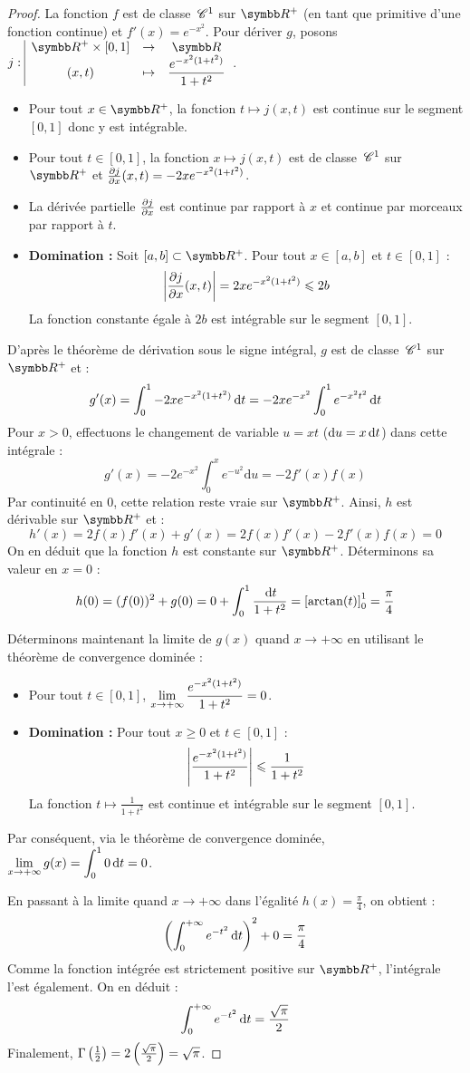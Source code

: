 \begin{proof}
    La fonction $f$ est de classe $\,\mathscr C^{1}$ sur $\R^+$ (en tant que primitive d'une fonction continue) et $f'(x) = e^{-x^2}$.
    Pour dériver $g$, posons $\fonction{j}{\R^+ \times [0,1]}{\R}{(x,t)}{\frac{e^{-x^2(1+t^2)}}{1+t^2}}$.
    \begin{itemize}
        \item Pour tout $x \in \R^+$, la fonction $t \mapsto j(x,t)$ est continue sur le segment $[0,1]$ donc y est intégrable.
        \item Pour tout $t \in [0,1]$, la fonction $x \mapsto j(x,t)$ est de classe $\,\mathscr C^{1}$ sur $\R^+$ et $\frac{\partial j}{\partial x}(x,t) = -2x e^{-x^2(1+t^2)}$.
        \item La dérivée partielle $\frac{\partial j}{\partial x}$ est continue par rapport à $x$ et continue par morceaux par rapport à $t$.
        \item \textbf{Domination :} Soit $[a,b] \subset \R^+$. Pour tout $x \in [a,b]$ et $t \in [0,1]$ :
        \[ \left|\frac{\partial j}{\partial x}(x,t)\right| = 2x e^{-x^2(1+t^2)} \leqslant 2b \]
        La fonction constante égale à $2b$ est intégrable sur le segment $[0,1]$.
    \end{itemize}
    D'après le théorème de dérivation sous le signe intégral, $g$ est de classe $\,\mathscr C^{1}$ sur $\R^+$ et :
    \[ g'(x) = \int_0^1 -2x e^{-x^2(1+t^2)} \,\mathrm{d}t = -2x e^{-x^2} \int_0^1 e^{-x^2 t^2} \,\mathrm{d}t \]
    Pour $x > 0$, effectuons le changement de variable $u = xt$ ($\mathrm{d}u = x\,\mathrm{d}t$) dans cette intégrale :
    \[ g'(x) = -2 e^{-x^2} \int_0^x e^{-u^2} \mathrm{d}u = -2 f'(x) f(x) \]
    Par continuité en $0$, cette relation reste vraie sur $\R^+$.
    Ainsi, $h$ est dérivable sur $\R^+$ et :
    \[ h'(x) = 2 f(x) f'(x) + g'(x) = 2 f(x) f'(x) - 2 f'(x) f(x) = 0 \]
    On en déduit que la fonction $h$ est constante sur $\R^+$. Déterminons sa valeur en $x=0$ :
    \[ h(0) = (f(0))^2 + g(0) = 0 + \int_0^1 \frac{\,\mathrm{d}t}{1+t^2} = \left[\arctan(t)\right]_0^1 = \frac{\pi}{4} \]

    Déterminons maintenant la limite de $g(x)$ quand $x \to +\infty$ en utilisant le théorème de convergence dominée :
    \begin{itemize}
        \item Pour tout $t \in [0,1]$, $\displaystyle\lim_{x \to +\infty} \frac{e^{-x^2(1+t^2)}}{1+t^2} = 0$.
        \item \textbf{Domination :} Pour tout $x \geqslant 0$ et $t \in [0,1]$ :
        \[ \left|\frac{e^{-x^2(1+t^2)}}{1+t^2}\right| \leqslant \frac{1}{1+t^2} \]
        La fonction $t \mapsto \frac{1}{1+t^2}$ est continue et intégrable sur le segment $[0,1]$.
    \end{itemize}
    Par conséquent, via le théorème de convergence dominée, $\displaystyle\lim_{x \to +\infty} g(x) = \int_0^1 0 \,\mathrm{d}t = 0$.

    En passant à la limite quand $x \to +\infty$ dans l'égalité $h(x) = \frac{\pi}{4}$, on obtient :
    \[ \left(\int_0^{+\infty} e^{-t^2} \,\mathrm{d}t\right)^2 + 0 = \frac{\pi}{4} \]
    Comme la fonction intégrée est strictement positive sur $\R^+$, l'intégrale l'est également. On en déduit :
    \[ \int_0^{+\infty} e^{-t^2} \,\mathrm{d}t = \frac{\sqrt{\pi}}{2} \]
    Finalement, $\Gamma\left(\frac{1}{2}\right) = 2 \left(\frac{\sqrt{\pi}}{2}\right) = \sqrt{\pi}$.
\end{proof}
